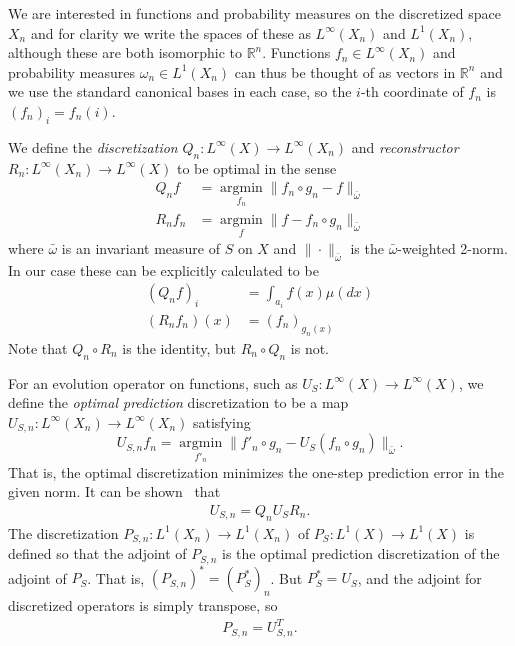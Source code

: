 \documentclass{aims}
\theoremstyle{definition}
\begin{document}
We are interested in functions and probability measures on the
discretized space $X_n$ and for clarity we write the spaces of
these as $L^\infty(X_n)$ and $L^1(X_n)$, although these are both
isomorphic to $\mathbb{R}^n$. Functions $f_n \in L^\infty(X_n)$ and
probability measures $\omega_n \in L^1(X_n)$ can thus be thought of as
vectors in $\mathbb{R}^n$ and we use the standard canonical bases
in each case, so the $i$-th coordinate of $f_n$ is $(f_n)_i = f_n(i)$.

We define the \emph{discretization} $Q_n : L^\infty(X) \to
L^\infty(X_n)$ and \emph{reconstructor} $R_n : L^\infty(X_n) \to
L^\infty(X)$ to be optimal in the sense
\begin{align}
  \label{eqn:discretization}
  Q_n f &= \operatorname*{argmin}_{f_n} \big\| f_n \circ g_n - f \big\|_{\bar{\omega}} \\
  \label{eqn:reconstructor}
  R_n f_n &= \operatorname*{argmin}_{f} \big\| f - f_n \circ g_n \big\|_{\bar{\omega}}
\end{align}
where $\bar{\omega}$ is an invariant measure of $S$ on $X$ and
$\|\cdot\|_{\bar{\omega}}$ is the $\bar{\omega}$-weighted 2-norm. In our
case these can be explicitly calculated to be
\begin{align}
  \label{eqn:discretization_particular}
  (Q_n f)_i &= \int_{a_i} f(x) \mu(dx) \\
  \label{eqn:reconstructor_particular}
  (R_n f_n)(x) &= (f_n)_{g_n(x)}
\end{align}
Note that $Q_n \circ R_n$ is the identity, but $R_n \circ Q_n$ is not.

For an evolution operator on functions, such as $U_S : L^\infty(X) \to L^\infty(X)$, we
define the \emph{optimal prediction} discretization to be a map $U_{S,n} :
L^\infty(X_n) \to L^\infty(X_n)$ satisfying
\begin{equation}
\label{objfunction1}
  U_{S,n} f_n = \operatorname*{argmin}_{f'_n}
  \big\| f'_n \circ g_n - U_S (f_n \circ g_n) \big\|_{\bar{\omega}}.
\end{equation}
That is, the optimal discretization minimizes the one-step prediction
error in the given norm. It can be shown~\cite{ChorinHald1,
  BeLaLiWe2009} that
\begin{align}
  U_{S,n} = Q_n U_S R_n.
\end{align}
The discretization $P_{S,n} : L^1(X_n) \to L^1(X_n)$ of $P_S : L^1(X)
\to L^1(X)$ is defined so that the adjoint of $P_{S,n}$ is the optimal
prediction discretization of the adjoint of $P_S$. That is,
$(P_{S,n})^* = (P_S^*)_n$. But $P_S^* = U_S$, and the adjoint for
discretized operators is simply transpose, so
\begin{align}
  P_{S,n} = U_{S,n}^T.
\end{align}
\end{document}
